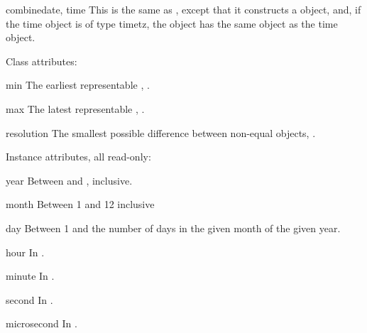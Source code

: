 \begin{funcdesc}{combine}{date, time}
  This is the same as , except that it
  constructs a  object, and, if the time object is
  of type timetz, the  object has the same
   object as the time object.
\end{funcdesc}

Class attributes:

\begin{memberdesc}{min}
  The earliest representable ,
  .
\end{memberdesc}

\begin{memberdesc}{max}
  The latest representable ,
  .
\end{memberdesc}

\begin{memberdesc}{resolution}
  The smallest possible difference between non-equal 
  objects, .
\end{memberdesc}

Instance attributes, all read-only:

\begin{memberdesc}{year}
  Between  and , inclusive.
\end{memberdesc}

\begin{memberdesc}{month}
  Between 1 and 12 inclusive
\end{memberdesc}

\begin{memberdesc}{day}
  Between 1 and the number of days in the given month of the given
  year.
\end{memberdesc}

\begin{memberdesc}{hour}
  In .
\end{memberdesc}

\begin{memberdesc}{minute}
  In .
\end{memberdesc}

\begin{memberdesc}{second}
  In .
\end{memberdesc}

\begin{memberdesc}{microsecond}
  In .
\end{memberdesc}

